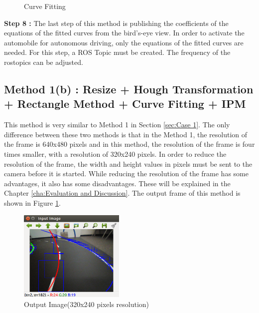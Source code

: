 		 	
\begin{figure}[H]
  \centering
  \caption{Curve Fitting}
\end{figure} 


\textbf{Step 8 : }The last step of this method is publishing the coefficients of the equations of the fitted curves from the bird's-eye view. In order to activate the automobile for autonomous driving, only the equations of the fitted curves are needed. For this step, a ROS Topic must be created. The frequency of the rostopics can be adjusted.

%



\subsection{Method 1(b) : Resize + Hough Transformation + Rectangle Method + Curve Fitting + IPM}\label{sec:Case 4}


This method is very similar to Method 1 in Section \ref{sec:Case 1}. The only difference between these two methods is that in the Method 1, the resolution of the frame is 640x480 pixels and in this method, the resolution of the frame is four times smaller, with a resolution of 320x240 pixels. In order to reduce the resolution of the frame, the width and height values in pixels must be sent to the camera before it is started. While reducing the resolution of the frame has some advantages, it also has some disadvantages. These will be explained in the Chapter \ref{cha:Evaluation and Discussion}. The output frame of this method is shown in Figure \ref{fig:Case4_OutputImage}.


\begin{figure}[H]
  \centering
  \includegraphics[width=0.45\textwidth]{./Bilder/Case4_OutputImage.png}
  \caption{Output Image(320x240 pixels resolution)}
  \label{fig:Case4_OutputImage}
\end{figure}






